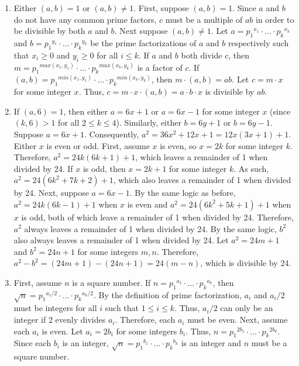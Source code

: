 \documentclass{article}
\begin{document}
\begin{enumerate}
\item Either $(a,b) = 1$ or $(a, b) \neq 1$.  First, suppose $(a, b) = 1$.  Since $a$ and $b$ do not have any common prime factors, $c$ must be a multiple of $ab$ in order to be divisible by both $a$ and $b$.  Next suppose $(a, b) \neq 1$.  Let $a = {p_1}^{x_1} \cdot  ... \cdot  {p_k}^{x_k}$ and $b = {p_1}^{y_1} \cdot  ... \cdot  {p_k}^{y_k}$ be the prime factorizations of $a$ and $b$ respectively such that $x_i \geq 0$ and $y_i \geq 0$ for all $i \leq k$.  If $a$ and $b$ both divide $c$, then $m = {p_1}^{max(x_1, y_1)} \cdot  ... \cdot  {p_k}^{max(x_k, y_k)}$ is a factor of $c$.  If $(a,b) = {p_1}^{min(x_1, y_1)} \cdot  ... \cdot  {p_k}^{min(x_k, y_k)}$, then  $m \cdot  (a,b) = ab$.  Let $c = m\cdot x$ for some integer $x$.  Thus, $c = m\cdot x\cdot (a,b) = a\cdot b\cdot x$ is divisible by $ab$.

\item If $(a, 6) = 1$, then either $a = 6x + 1$ or $a = 6x - 1$ for some integer $x$
(since $(k, 6) > 1$ for all $2 \leq k \leq 4$).
Similarly, either $b = 6y + 1$ or $b = 6y - 1$.  Suppose $a = 6x + 1$.  Consequently, $a^2 = 36x^2 + 12x + 1 = 12x(3x + 1) + 1$.  Either $x$ is even or odd.  First, assume $x$ is even, so $x = 2k$ for some integer $k$.  Therefore, $a^2 = 24k(6k+1) + 1$, which leaves a remainder of 1 when divided by 24.  If $x$ is odd, then $x = 2k+1$ for some integer $k$.  As such, $a^2 = 24(6k^2 + 7k + 2) + 1$, which also leaves a remainder of 1 when divided by 24.  Next, suppose $a = 6x - 1$.  By the same logic as before, $a^2 = 24k(6k - 1) + 1$ when $x$ is even and $a^2 = 24(6k^2 + 5k +1) + 1$ when $x$ is odd, both of which leave a remainder of 1 when divided by 24.  Therefore, $a^2$ always leaves a remainder of 1 when divided by 24.  By the same logic, $b^2$ also always leaves a remainder of 1 when divided by 24.  Let $a^2 = 24m + 1$ and $b^2 = 24n + 1$ for some integers $m, n$.  Therefore, $a^2 - b^2 = (24m + 1) - (24n + 1) = 24(m-n)$, which is divisible by 24.

\item First, assume $n$ is a square number.  If $n = {p_1}^{a_1} \cdot  ... \cdot  {p_k}^{a_k}$, then $\sqrt n = {p_1}^{a_1/2} \cdot  ... \cdot  {p_k}^{a_k/2}$.  By the definition of prime factorization, $a_i$ and $a_i/2$ must be integers for all $i$ such that $1 \leq i \leq k$.  Thus, $a_i/2$ can only be an integer if 2 evenly divides $a_i$.  Therefore, each $a_i$ must be even.  Next, assume each $a_i$ is even.  Let $a_i = 2b_i$ for some integers $b_i$.  Thus, $n = {p_1}^{2b_1} \cdot  ... \cdot  {p_k}^{2b_k}$.  Since each $b_i$ is an integer, $\sqrt n = {p_1}^{b_1} \cdot  ... \cdot  {p_k}^{b_k}$ is an integer and $n$ must be a square number.


\end{enumerate}
\end{document}
